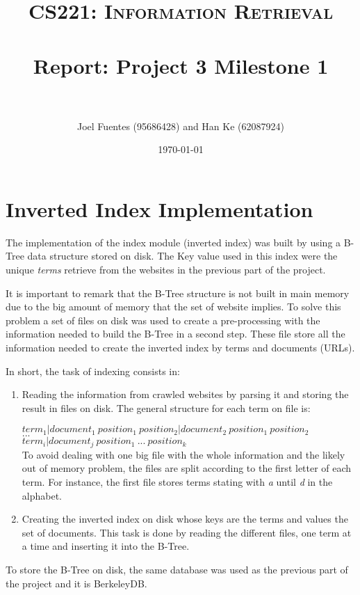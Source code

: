 \documentclass[paper=a4, fontsize=11pt]{scrartcl} %
\title{	
\normalfont \normalsize 
\textsc{CS221: Information Retrieval} \\ [25pt] %
\horrule{0.5pt} \\[0.4cm] %
\huge Report: Project 3 Milestone 1 \\ %
\horrule{2pt} \\[0.5cm] %
}
\author{Joel Fuentes (95686428)  and Han Ke (62087924)} %
\date{\normalsize\today} %
\numberwithin{equation}{section} %
\numberwithin{table}{section} %
\begin{document}
\maketitle 

\section*{Inverted Index Implementation}
The implementation of the index module (inverted index) was built by using a B-Tree data structure stored on disk. The Key value used in this index were the unique \textit{terms} retrieve from the websites in the previous part of the project.

It is important to remark that the B-Tree structure is not built in main memory due to the big amount of memory that the set of website implies. To solve this problem a set of files on disk was used to create a pre-processing with the information needed to build the B-Tree in a second step. These file store all the information needed to create the inverted index by terms and documents (URLs). 

In short, the task of indexing consists in:
\begin{enumerate}
\item Reading the information from crawled websites by parsing it and storing the result in files on disk. The general structure for each term on file is:

$term_1|document_1 \ position_1 \ position_2|document_2 \ position_1 \ position_2$\\
$...$\\
$term_i|document_j \ position_1 \ ... \ position_k$  \\
To avoid dealing with one big file with the whole information and the likely out of memory problem, the files are split according to the first letter of each term. For instance, the first file stores terms stating with \textit{a} until \textit{d} in the alphabet.
\item Creating the inverted index on disk whose keys are the terms and values the set of documents. This task is done by reading the different files, one term at a time and inserting it into the B-Tree.
\end{enumerate}   
To store the B-Tree on disk, the same database was used as the previous part of the project and it is BerkeleyDB.
\end{document}

